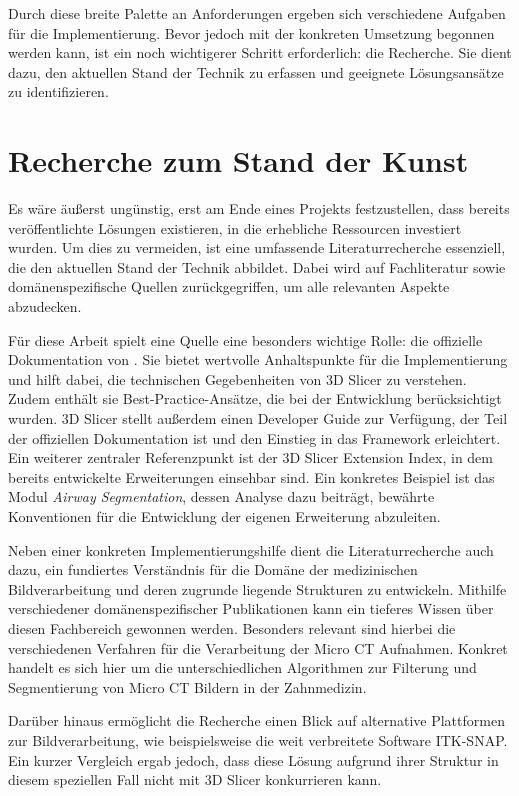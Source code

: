 Durch diese breite Palette an Anforderungen ergeben sich verschiedene Aufgaben
für die Implementierung. Bevor jedoch mit der konkreten Umsetzung begonnen werden
kann, ist ein noch wichtigerer Schritt erforderlich: die Recherche. Sie dient
dazu, den aktuellen Stand der Technik zu erfassen und geeignete Lösungsansätze zu
identifizieren.

\section{Recherche zum Stand der Kunst}
Es wäre äußerst ungünstig, erst am Ende eines Projekts festzustellen, dass bereits
veröffentlichte Lösungen existieren, in die erhebliche Ressourcen investiert
wurden. Um dies zu vermeiden, ist eine umfassende Literaturrecherche essenziell,
die den aktuellen Stand der Technik abbildet. Dabei wird auf Fachliteratur sowie
domänenspezifische Quellen zurückgegriffen, um alle relevanten Aspekte abzudecken.

Für diese Arbeit spielt eine Quelle eine besonders wichtige Rolle: die
offizielle Dokumentation von \citet{slicer2024}. Sie bietet wertvolle
Anhaltspunkte für die Implementierung und hilft dabei, die technischen Gegebenheiten
von 3D Slicer zu verstehen. Zudem enthält sie Best-Practice-Ansätze, die bei der
Entwicklung berücksichtigt wurden. 3D Slicer stellt außerdem einen Developer
Guide zur Verfügung, der Teil der offiziellen Dokumentation ist und den Einstieg
in das Framework erleichtert. Ein weiterer zentraler Referenzpunkt ist der 3D
Slicer Extension Index, in dem bereits entwickelte Erweiterungen einsehbar sind.
Ein konkretes Beispiel ist das Modul \textit{Airway Segmentation}, dessen
Analyse dazu beiträgt, bewährte Konventionen für die Entwicklung der eigenen Erweiterung
abzuleiten.

Neben einer konkreten Implementierungshilfe dient die Literaturrecherche auch dazu,
ein fundiertes Verständnis für die Domäne der medizinischen Bildverarbeitung und
deren zugrunde liegende Strukturen zu entwickeln. Mithilfe verschiedener domänenspezifischer
Publikationen kann ein tieferes Wissen über diesen Fachbereich gewonnen werden.
Besonders relevant sind hierbei die verschiedenen Verfahren für die Verarbeitung
der Micro CT Aufnahmen. Konkret handelt es sich hier um die unterschiedlichen Algorithmen
zur Filterung und Segmentierung von Micro CT Bildern in der Zahnmedizin.

Darüber hinaus ermöglicht die Recherche einen Blick auf alternative Plattformen zur
Bildverarbeitung, wie beispielsweise die weit verbreitete Software ITK-SNAP. Ein
kurzer Vergleich ergab jedoch, dass diese Lösung aufgrund ihrer Struktur in
diesem speziellen Fall nicht mit 3D Slicer konkurrieren kann.

